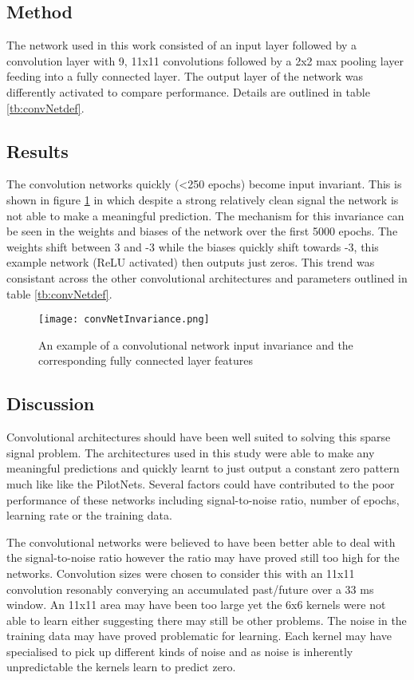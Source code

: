 \subsection{Method}
\label{sec:convMethod}
The network used in this work consisted of an input layer followed by a convolution layer with 9, 11x11 convolutions followed by a 2x2 max pooling layer feeding into a fully connected layer. 
The output layer of the network was differently activated to compare performance. 
Details are outlined in table \ref{tb:convNetdef}.


\subsection{Results}
The convolution networks quickly (\textless 250 epochs) become input invariant.
This is shown in figure \ref{fig:convInputInvariance} in which despite a strong relatively clean signal the network is not able to make a meaningful prediction. 
The mechanism for this invariance can be seen in the weights and biases of the network over the first 5000 epochs.
The weights shift between 3 and -3 while the biases quickly shift towards -3, this example network (ReLU activated) then outputs just zeros.
This trend was consistant across the other convolutional architectures and parameters outlined in table \ref{tb:convNetdef}.

\begin{figure}[h]
    \centering
    \texttt{[image: convNetInvariance.png]}
    \caption{An example of a convolutional network input invariance and the corresponding fully connected layer features}
    \label{fig:convInputInvariance}
\end{figure}

\subsection{Discussion}
Convolutional architectures should have been well suited to solving this sparse signal problem.
The architectures used in this study were able to make any meaningful predictions and quickly learnt to just output a constant zero pattern much like like the PilotNets.
Several factors could have contributed to the poor performance of these networks including signal-to-noise ratio, number of epochs, learning rate or the training data. 

The convolutional networks were believed to have been better able to deal with the signal-to-noise ratio however the ratio may have proved still too high for the networks.
Convolution sizes were chosen to consider this with an 11x11 convolution resonably converying an accumulated past/future over a 33 ms window. 
An 11x11 area may have been too large yet the 6x6 kernels were not able to learn either suggesting there may still be other problems.
The noise in the training data may have proved problematic for learning. 
Each kernel may have specialised to pick up different kinds of noise and as noise is inherently unpredictable the kernels learn to predict zero. 

